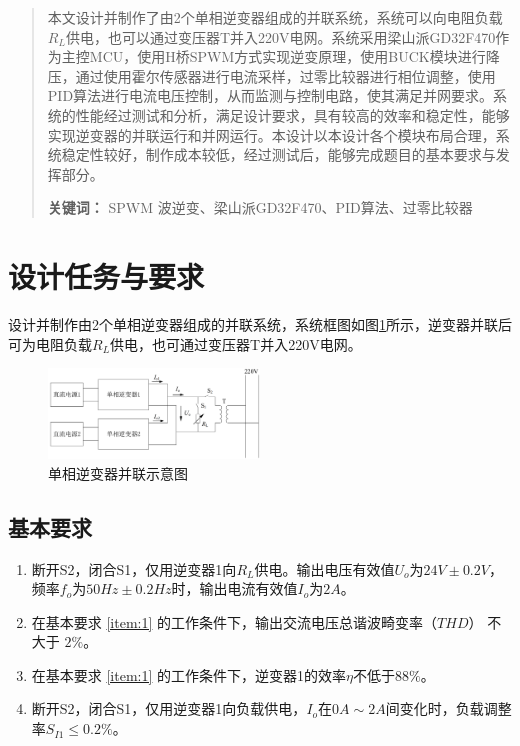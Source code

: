 \documentclass[a4paper,12pt]{article}
\begin{document}



\newpage
\begin{abstract}
本文设计并制作了由2个单相逆变器组成的并联系统，系统可以向电阻负载$R_L$供电，也可以通过变压器T并入220V电网。系统采用梁山派GD32F470作为主控MCU，使用H桥SPWM方式实现逆变原理，使用BUCK模块进行降压，通过使用霍尔传感器进行电流采样，过零比较器进行相位调整，使用PID算法进行电流电压控制，从而监测与控制电路，使其满足并网要求。系统的性能经过测试和分析，满足设计要求，具有较高的效率和稳定性，能够实现逆变器的并联运行和并网运行。本设计以本设计各个模块布局合理，系统稳定性较好，制作成本较低，经过测试后，能够完成题目的基本要求与发挥部分。


\noindent \textbf{关键词：} 
SPWM 波逆变、梁山派GD32F470、PID算法、过零比较器
\end{abstract}

\newpage

\tableofcontents

\newpage

\section{设计任务与要求}
设计并制作由2个单相逆变器组成的并联系统，系统框图如图\ref{fig1}所示，逆变器并联后可为电阻负载$R_L$供电，也可通过变压器T并入220V电网。
\begin{figure}[htbp]
\centering
\includegraphics[width=0.5\textwidth]{src/fig1.png}
\caption{单相逆变器并联示意图}
\label{fig1}
\end{figure}
\subsection{基本要求}
\begin{enumerate}
    \item 断开S2，闭合S1，仅用逆变器1向$R_L$供电。输出电压有效值$U_o$为$24V\pm0.2V$，频率$f_o$为$50Hz\pm0.2Hz$时，输出电流有效值$I_o$为$2A$。\label{item:1}
    \item 在基本要求 \ref{item:1} 的工作条件下，输出交流电压总谐波畸变率（$THD$） 不大于 $2\%$。
    \item 在基本要求 \ref{item:1} 的工作条件下，逆变器1的效率$\eta$不低于$88\%$。
    \item 断开S2，闭合S1，仅用逆变器1向负载供电，$I_o$在$0A\sim 2A$间变化时，负载调整率$S_{I1}\leqslant 0.2\%$。
\end{enumerate}
\end{document}
